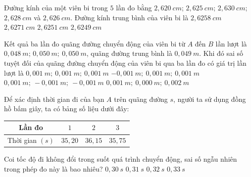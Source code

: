 \begin{vidu}
Đường kính của một viên bi trong $5$ lần đo bằng $2,620\ cm$; $2,625\ cm$; $2,630\ cm$; $2,628\ cm$ và $2,626\ cm$. Đường kính trung bình của viên bi là
\choice
{\True $2,6258\ cm$}
{$2,6271\ cm$}
{$2,6251\ cm$}
{$2,6249\ cm$}
\loigiai{

}
\end{vidu}
\begin{vidu}
Kết quả ba lần đo quãng đường chuyển động của viên bi từ $A$ đến $B$ lần lượt là $0,048\ m$; $0,050\ m;\ 0,050\ m$, quãng đường trung bình là $0,049\ m$. Khi đó sai số tuyệt đối của quãng đường chuyển động của viên bi qua ba lần đo có giá trị lần lượt là
\choice
{\True $0,001\ m;\ 0,001\ m;\ 0,001\ m$}
{$-0,001\ m;\ 0,001\ m;\ 0,001\ m$}
{$0,001\ m;\ -0,001\ m;\ -0,001\ m$}
{$0,001\ m;\ 0,000\ m;\ 0,002\ m$}
\loigiai{
}
\end{vidu}
\begin{vidu}
Để xác định thời gian đi của bạn $A$ trên quãng đường $s$, người ta sử dụng đồng hồ bấm giây, ta có bảng số liệu dưới đây:
\begin{center}
\begin{tabular}{|c|c|c|c|}
\hline
Lần đo & $1$ & $2$ & $3$ \\
\hline
Thời gian $(s)$ & $35,20$ & $36,15$ & $35,75$ \\
\hline
\end{tabular}
\end{center}

Coi tốc độ đi không đổi trong suốt quá trình chuyển động, sai số ngẫu nhiên trong phép đo này là bao nhiêu?
\choice
{$0,30\ s$}
{$0,31\ s$}
{$0,32\ s$}
{\True $0,33\ s$}
\loigiai{
}
\end{vidu}

